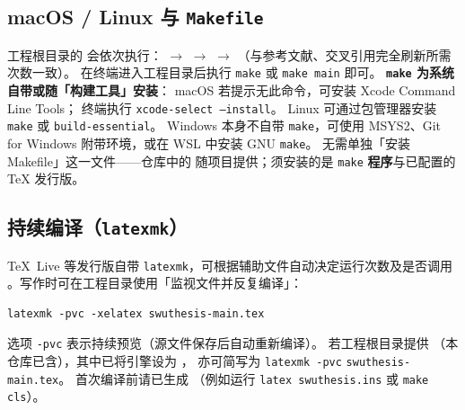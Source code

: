 \subsection{macOS / Linux 与 \texttt{Makefile}}\label{sec:compile-make}
工程根目录的  会依次执行：%
 $\rightarrow$  $\rightarrow$ %
  $\rightarrow$ %
（与参考文献、交叉引用完全刷新所需次数一致）。%
在终端进入工程目录后执行 \texttt{make} 或 \texttt{make main} 即可。%
\textbf{\texttt{make} 为系统自带或随「构建工具」安装}：%
macOS 若提示无此命令，可安装 Xcode Command Line Tools；%
终端执行 \texttt{xcode-select --install}。%
Linux 可通过包管理器安装 \texttt{make} 或 \texttt{build-essential}。%
Windows 本身不自带 \texttt{make}，可使用 MSYS2、Git for Windows 附带环境，或在 WSL 中安装 GNU \texttt{make}。%
无需单独「安装 Makefile」这一文件——仓库中的  随项目提供；须安装的是 \texttt{make} \textbf{程序}与已配置的 \TeX{} 发行版。

\subsection{持续编译（\texttt{latexmk}）}
TeX~Live 等发行版自带 \texttt{latexmk}，可根据辅助文件自动决定运行次数及是否调用 。写作时可在工程目录使用「监视文件并反复编译」：
\begin{verbatim}
latexmk -pvc -xelatex swuthesis-main.tex
\end{verbatim}
选项 \texttt{-pvc} 表示持续预览（源文件保存后自动重新编译）。%
若工程根目录提供 （本仓库已含），其中已将引擎设为 ，%
亦可简写为%
\texttt{latexmk -pvc} \texttt{swuthesis-main.tex}。%
首次编译前请已生成 %
（例如运行 \texttt{latex swuthesis.ins} 或 \texttt{make cls}）。%

